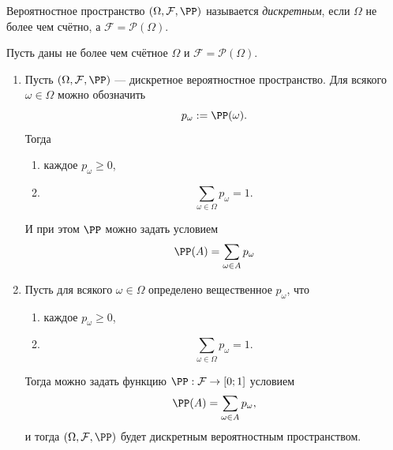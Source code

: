 \documentclass[12pt,a4paper]{article}
\begin{document}
    \begin{definition}
        Вероятностное пространство $(\Omega, \mathcal{F}, \PP)$ называется \emph{дискретным}, если $\Omega$ не более чем счётно, а $\mathcal{F} = \mathcal{P}(\Omega)$.
    \end{definition}

    \begin{theorem}
        Пусть даны не более чем счётное $\Omega$ и $\mathcal{F} = \mathcal{P}(\Omega)$.
        \begin{enumerate}
            \item Пусть $(\Omega, \mathcal{F}, \PP)$ --- дискретное вероятностное пространство. Для всякого $\omega \in \Omega$ можно обозначить
                \[p_\omega := \PP(\omega).\]
                Тогда
                \begin{enumerate}
                    \item каждое $p_\omega \geqslant 0$,
                    \item
                        \[\sum_{\omega \in \Omega} p_\omega = 1.\]
                \end{enumerate}
                И при этом $\PP$ можно задать условием
                \[\PP(A) = \sum_{\omega \in A} p_\omega\]
            \item Пусть для всякого $\omega \in \Omega$ определено вещественное $p_\omega$, что
                \begin{enumerate}
                    \item каждое $p_\omega \geqslant 0$,
                    \item
                        \[\sum_{\omega \in \Omega} p_\omega = 1.\]
                \end{enumerate}
                Тогда можно задать функцию $\PP: \mathcal{F} \to [0; 1]$ условием
                \[\PP(A) = \sum_{\omega \in A} p_\omega,\]
                и тогда $(\Omega, \mathcal{F}, \PP)$ будет дискретным вероятностным пространством.
        \end{enumerate}
    \end{theorem}
\end{document}
